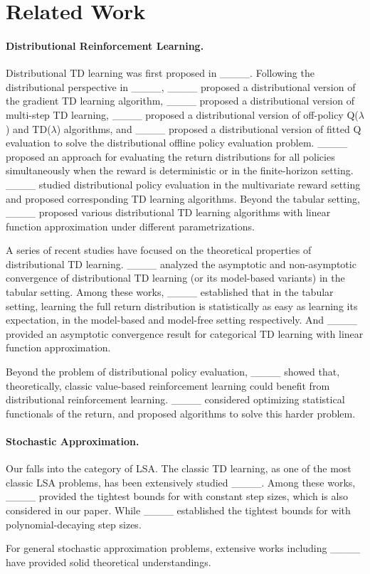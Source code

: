 \section{Related Work}
\paragraph{Distributional Reinforcement Learning.}
Distributional TD learning was first proposed in ____.
Following the distributional perspective in ____, ____ proposed a distributional version of the gradient TD learning algorithm,
____ proposed a distributional version of multi-step TD learning, ____ proposed a distributional version of off-policy Q($\lambda$) and TD($\lambda$) algorithms, and ____ proposed a distributional version of fitted Q evaluation to solve the distributional offline policy evaluation problem.
____ proposed an approach for evaluating the return distributions for all policies simultaneously when the reward is deterministic or in the finite-horizon setting. 
____ studied distributional policy evaluation in the multivariate reward setting and proposed corresponding TD learning algorithms.
Beyond the tabular setting, ____ proposed various distributional TD learning algorithms with linear function approximation under different parametrizations.

A series of recent studies have focused on the theoretical properties of distributional TD learning.
____ analyzed the asymptotic and non-asymptotic convergence of distributional TD learning (or its model-based variants) in the tabular setting.
Among these works, ____ established that in the tabular setting, learning the full return distribution is statistically as easy as learning its expectation, in the model-based and model-free setting respectively.
And ____ provided an asymptotic convergence result for categorical TD learning with linear function approximation.

Beyond the problem of distributional policy evaluation,
____ showed that, theoretically, classic value-based reinforcement learning could benefit from distributional reinforcement learning.
____ considered optimizing statistical functionals of the return, and proposed algorithms to solve this harder problem.

\paragraph{Stochastic Approximation.}
Our {\LCTD} falls into the category of LSA. 
The classic TD learning, as one of the most classic LSA problems, has been extensively studied ____. 
Among these works, ____ provided the tightest bounds for {\LTD} with constant step sizes, which is also considered in our paper.
While ____ established the tightest bounds for {\LTD} with polynomial-decaying step sizes.

For general stochastic approximation problems, extensive works including ____ have provided solid theoretical understandings.
